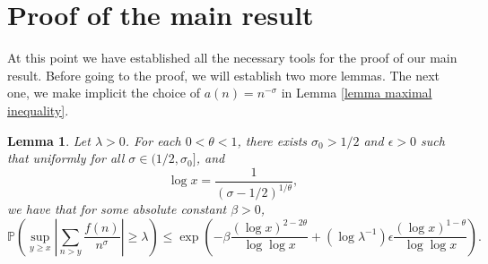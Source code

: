 \documentclass[reqno0,12pt]{amsart}
\newtheorem{lemma}{Lemma}[section]
\theoremstyle{remark}
\newcommand{\PP}{\mathbb{P}}
\begin{document}
\section{Proof of the main result}
At this point we have established all the necessary tools for the proof of our main result. Before going to the proof, we will establish two more lemmas. The next one, we make implicit the choice of $a(n)=n^{-\sigma}$ in Lemma \ref{lemma maximal inequality}.
\begin{lemma}\label{lemma estimate for the sup} Let $\lambda>0$. For each $0<\theta<1$, there exists $\sigma_0>1/2$ and $\epsilon>0$ such that uniformly for all $\sigma\in(1/2,\sigma_0]$, and
$$\log x = \frac{1}{(\sigma-1/2)^{1/\theta}},$$ 
we have that for some absolute constant $\beta>0$,
$$\PP\left(\sup_{y\geq x}\left|\sum_{n>y}\frac{f(n)}{n^\sigma}\right|\geq \lambda\right)\leq \exp\left(-\beta \frac{(\log x)^{2-2\theta}}{\log\log x}+(\log\lambda ^{-1})\epsilon\frac{(\log x)^{1-\theta}}{\log\log x}\right).$$
\end{lemma}
\end{document}
